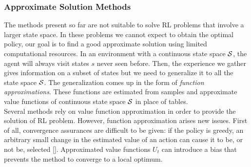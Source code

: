 \subsubsection{Approximate Solution Methods}
The methods present so far are not suitable to solve \ac{RL} problems that involve a larger state space. In these problems we cannot expect to obtain the optimal policy, our goal is to find a good approximate solution using limited computational resources. In an environment with a continuous state space $\mathcal{S}$, the agent will always visit states $s$ never seen before. Then, the experience we gather gives information on a subset of states but we need to generalize it to all the state space $\mathcal{S}$. The generalization comes up in the form of \emph{function approximations}. These functions are estimated from samples and approximate value functions of continuous state space $\mathcal{S}$ in place of tables.\\
\newline
Several methods rely on value function approximation in order to provide the solution of \ac{RL} problem. However, function approximation arises new issues. First of all, convergence assurances are difficult to be given: if the policy is greedy, an arbitrary small change in the estimated value of an action can cause it to be, or not be, selected [\citet{Sutton1999PolicyGM}]. Approximated value functions $U_t$ can introduce a bias that prevents the method to converge to a local optimum. 


